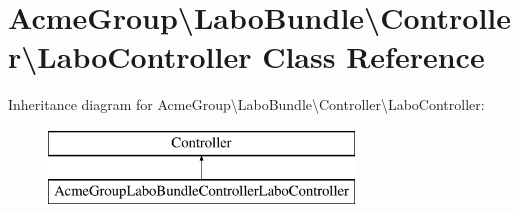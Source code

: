 \hypertarget{class_acme_group_1_1_labo_bundle_1_1_controller_1_1_labo_controller}{\section{Acme\+Group\textbackslash{}Labo\+Bundle\textbackslash{}Controller\textbackslash{}Labo\+Controller Class Reference}
\label{class_acme_group_1_1_labo_bundle_1_1_controller_1_1_labo_controller}
}
Inheritance diagram for Acme\+Group\textbackslash{}Labo\+Bundle\textbackslash{}Controller\textbackslash{}Labo\+Controller\+:\begin{figure}[H]
\begin{center}
\leavevmode
\includegraphics[height=2.000000cm]{class_acme_group_1_1_labo_bundle_1_1_controller_1_1_labo_controller}
\end{center}
\end{figure}
